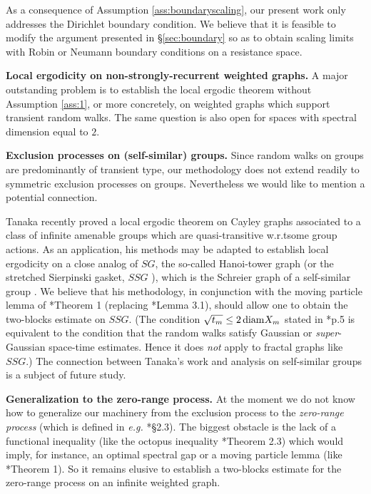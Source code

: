 \documentclass[11pt]{amsart}
\theoremstyle{plain}
\theoremstyle{definition}
\theoremstyle{remark}
\begin{document}
As a consequence of Assumption \ref{ass:boundaryscaling}, our present work only addresses the Dirichlet boundary condition. We believe that it is feasible to modify the argument presented in \S\ref{sec:boundary} so as to obtain scaling limits with Robin or Neumann boundary conditions on a resistance space.

\textbf{Local ergodicity on non-strongly-recurrent weighted graphs.} A major outstanding problem is to establish the local ergodic theorem without Assumption \ref{ass:1}, or more concretely, on weighted graphs which support transient random walks. The same question is also open for spaces with spectral dimension equal to $2$. 

\textbf{Exclusion processes on (self-similar) groups.}
Since random walks on groups \cite{Woess} are predominantly of transient type, our methodology does not extend readily to symmetric exclusion processes on groups. Nevertheless we would like to mention a potential connection.

Tanaka \cite{Tanaka} recently proved a local ergodic theorem on Cayley graphs associated to a class of infinite amenable groups which are quasi-transitive w.r.t\@ some group actions. As an application, his methods may be adapted to establish local ergodicity on a close analog of $SG$, the so-called Hanoi-tower graph (or the stretched Sierpinski gasket, $SSG$ \cite{AFK16}), which is the Schreier graph of a self-similar group \cite{NekBook}. We believe that his methodology, in conjunction with the moving particle lemma of \cite{ChenMPL}*{Theorem 1} (replacing \cite{Tanaka}*{Lemma 3.1}), should allow one to obtain the two-blocks estimate on $SSG$. (The condition $\sqrt{t_m} \leq 2\,{\rm diam}X_m$ stated in \cite{Tanaka}*{p.\@ 5} is equivalent to the condition that the random walks satisfy Gaussian or \emph{super}-Gaussian space-time estimates. Hence it does \emph{not} apply to fractal graphs like $SSG$.) The connection between Tanaka's work and analysis on self-similar groups \cite{NekTep} is a subject of future study.

\textbf{Generalization to the zero-range process.}
At the moment we do not know how to generalize our machinery from the exclusion process to the \emph{zero-range process} (which is defined in \emph{e.g.\@} \cite{KipnisLandim}*{\S2.3}). The biggest obstacle is the lack of a functional inequality (like the octopus inequality \cite{CLR09}*{Theorem 2.3}) which would imply, for instance, an optimal spectral gap or a moving particle lemma (like \cite{ChenMPL}*{Theorem 1}). So it remains elusive to establish a two-blocks estimate for the zero-range process on an infinite weighted graph.
\end{document}
